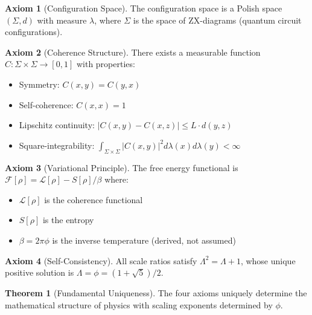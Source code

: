 \documentclass[11pt]{article}
\theoremstyle{definition}
\newtheorem{axiom}{Axiom}[section]
\newtheorem{theorem}{Theorem}[section]
\newcommand{\goldenratio}{\phi}
\newcommand{\configspace}{\Sigma}
\newcommand{\density}{\rho}
\newcommand{\freeenergy}{\mathcal{F}}
\newcommand{\lagrangian}{\mathcal{L}}
\newcommand{\entropy}{S}
\begin{document}
\begin{axiom}[Configuration Space]
The configuration space is a Polish space $(\configspace, d)$ with measure $\lambda$, where $\configspace$ is the space of ZX-diagrams (quantum circuit configurations).
\end{axiom}

\begin{axiom}[Coherence Structure]
There exists a measurable function $C: \configspace \times \configspace \to [0,1]$ with properties:
\begin{itemize}
\item Symmetry: $C(x,y) = C(y,x)$
\item Self-coherence: $C(x,x) = 1$
\item Lipschitz continuity: $|C(x,y) - C(x,z)| \leq L \cdot d(y,z)$
\item Square-integrability: $\int_{\configspace \times \configspace} |C(x,y)|^2 d\lambda(x) d\lambda(y) < \infty$
\end{itemize}
\end{axiom}

\begin{axiom}[Variational Principle]
The free energy functional is $\freeenergy[\density] = \lagrangian[\density] - \entropy[\density]/\beta$ where:
\begin{itemize}
\item $\lagrangian[\density]$ is the coherence functional
\item $\entropy[\density]$ is the entropy
\item $\beta = 2\pi\goldenratio$ is the inverse temperature (derived, not assumed)
\end{itemize}
\end{axiom}

\begin{axiom}[Self-Consistency]
All scale ratios satisfy $\Lambda^2 = \Lambda + 1$, whose unique positive solution is $\Lambda = \goldenratio = (1+\sqrt{5})/2$.
\end{axiom}

\begin{theorem}[Fundamental Uniqueness]
The four axioms uniquely determine the mathematical structure of physics with scaling exponents determined by $\goldenratio$.
\end{theorem}
\end{document}
